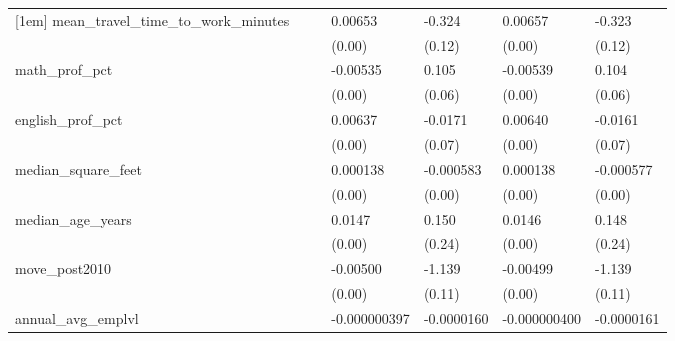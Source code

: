 {\begin{longtable}{|l|ll|ll|ll|}
            [1em]
            mean\_travel\_time\_to\_work\_minutes&                     &                     &     0.00653\sym{***}&      -0.324\sym{**} &     0.00657\sym{***}&      -0.323\sym{**} \\
                        &                     &                     &      (0.00)         &      (0.12)         &      (0.00)         &      (0.12)         \\
            [1em]
            math\_prof\_pct&                     &                     &    -0.00535\sym{***}&       0.105         &    -0.00539\sym{***}&       0.104         \\
                        &                     &                     &      (0.00)         &      (0.06)         &      (0.00)         &      (0.06)         \\
            [1em]
            english\_prof\_pct&                     &                     &     0.00637\sym{***}&     -0.0171         &     0.00640\sym{***}&     -0.0161         \\
                        &                     &                     &      (0.00)         &      (0.07)         &      (0.00)         &      (0.07)         \\
            [1em]
            median\_square\_feet&                     &                     &    0.000138\sym{***}&   -0.000583         &    0.000138\sym{***}&   -0.000577         \\
                        &                     &                     &      (0.00)         &      (0.00)         &      (0.00)         &      (0.00)         \\
            [1em]
            median\_age\_years&                     &                     &      0.0147\sym{***}&       0.150         &      0.0146\sym{***}&       0.148         \\
                        &                     &                     &      (0.00)         &      (0.24)         &      (0.00)         &      (0.24)         \\
            [1em]
            move\_post2010&                     &                     &    -0.00500\sym{**} &      -1.139\sym{***}&    -0.00499\sym{**} &      -1.139\sym{***}\\
                        &                     &                     &      (0.00)         &      (0.11)         &      (0.00)         &      (0.11)         \\
            [1em]
            annual\_avg\_emplvl&                     &                     &-0.000000397\sym{***}&  -0.0000160\sym{*}  &-0.000000400\sym{***}&  -0.0000161\sym{*}  \\

\end{longtable}}
